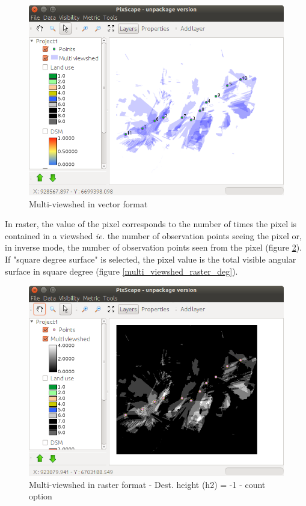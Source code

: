\documentclass{report}
\begin{document}
\begin{figure}[H]
	\includegraphics[scale=0.5]{img/multi_viewshed_vector-en.png} 
	\caption{Multi-viewshed in vector format}
	\label{multi_viewshed_vector}
\end{figure}

In raster, the value of the pixel corresponds to the number of times the pixel is contained in a viewshed \textit{ie.} the number of observation points seeing the pixel or, in inverse mode, the number of observation points seen from the pixel (figure \ref{multi_viewshed_raster}). If "square degree surface" is selected, the pixel value is the total visible angular surface in square degree (figure \ref{multi_viewshed_raster_deg}).

\begin{figure}[H]
	\includegraphics[scale=0.5]{img/multi_viewshed_raster-en.png} 
	\caption{Multi-viewshed in raster format - Dest. height (h2) = -1 - count option}
	\label{multi_viewshed_raster}
\end{figure}
\end{document}
